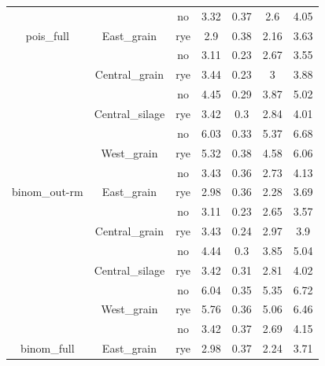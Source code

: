 \documentclass[]{article}
\begin{document}
\begin{table}[H]
\begin{tabular}[t]{ccccccc}
\rowcolor{gray!6}   &  & no & 3.32 & 0.37 & 2.6 & 4.05\\

\multirow{-8}{*}{\centering\arraybackslash pois\_full} & \multirow{-2}{*}{\centering\arraybackslash East\_grain} & rye & 2.9 & 0.38 & 2.16 & 3.63\\
\cmidrule{1-7}
\rowcolor{gray!6}   &  & no & 3.11 & 0.23 & 2.67 & 3.55\\

 & \multirow{-2}{*}{\centering\arraybackslash Central\_grain} & rye & 3.44 & 0.23 & 3 & 3.88\\

\rowcolor{gray!6}   &  & no & 4.45 & 0.29 & 3.87 & 5.02\\

 & \multirow{-2}{*}{\centering\arraybackslash Central\_silage} & rye & 3.42 & 0.3 & 2.84 & 4.01\\

\rowcolor{gray!6}   &  & no & 6.03 & 0.33 & 5.37 & 6.68\\

 & \multirow{-2}{*}{\centering\arraybackslash West\_grain} & rye & 5.32 & 0.38 & 4.58 & 6.06\\

\rowcolor{gray!6}   &  & no & 3.43 & 0.36 & 2.73 & 4.13\\

\multirow{-8}{*}{\centering\arraybackslash binom\_out-rm} & \multirow{-2}{*}{\centering\arraybackslash East\_grain} & rye & 2.98 & 0.36 & 2.28 & 3.69\\
\cmidrule{1-7}
\rowcolor{gray!6}   &  & no & 3.11 & 0.23 & 2.65 & 3.57\\

 & \multirow{-2}{*}{\centering\arraybackslash Central\_grain} & rye & 3.43 & 0.24 & 2.97 & 3.9\\

\rowcolor{gray!6}   &  & no & 4.44 & 0.3 & 3.85 & 5.04\\

 & \multirow{-2}{*}{\centering\arraybackslash Central\_silage} & rye & 3.42 & 0.31 & 2.81 & 4.02\\

\rowcolor{gray!6}   &  & no & 6.04 & 0.35 & 5.35 & 6.72\\

 & \multirow{-2}{*}{\centering\arraybackslash West\_grain} & rye & 5.76 & 0.36 & 5.06 & 6.46\\

\rowcolor{gray!6}   &  & no & 3.42 & 0.37 & 2.69 & 4.15\\

\multirow{-8}{*}{\centering\arraybackslash binom\_full} & \multirow{-2}{*}{\centering\arraybackslash East\_grain} & rye & 2.98 & 0.37 & 2.24 & 3.71\\
\bottomrule
\end{tabular}
\end{table}
\end{document}
